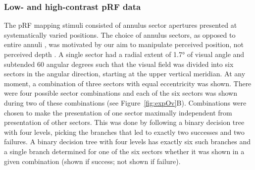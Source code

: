 \subsubsection{Low- and high-contrast pRF data}
The pRF mapping stimuli consisted of annulus sector apertures presented at systematically varied positions. The choice of annulus sectors, as opposed to entire annuli \parencite{Liu2006}, was motivated by our aim to manipulate perceived position, not perceived depth \parencite{Edwards2003}. A single sector had a radial extent of 1.7° of visual angle and subtended 60 angular degrees such that the visual field was divided into six sectors in the angular direction, starting at the upper vertical meridian. At any moment, a combination of three sectors with equal eccentricity was shown. There were four possible sector combinations and each of the six sectors was shown during two of these combinations (see Figure~\ref{fig:expOv}B). Combinations were chosen to make the presentation of one sector maximally independent from presentation of other sectors. This was done by following a binary decision tree with four levels, picking the branches that led to exactly two successes and two failures. A binary decision tree with four levels has exactly six such branches and a single branch determined for one of the six sectors whether it was shown in a given combination (shown if success; not shown if failure).

